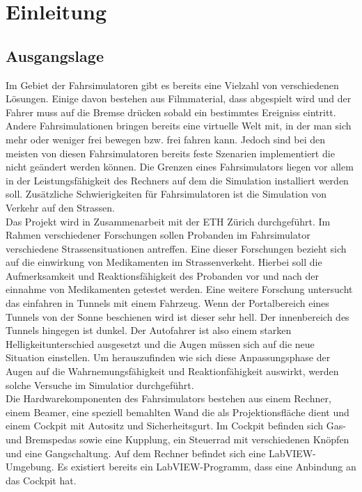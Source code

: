 \section{Einleitung}
\subsection{Ausgangslage}

Im Gebiet der Fahrsimulatoren gibt es bereits eine Vielzahl von verschiedenen Lösungen. Einige davon bestehen aus Filmmaterial, dass abgespielt wird und der Fahrer muss auf die Bremse drücken sobald ein bestimmtes Ereigniss eintritt. Andere Fahrsimulationen bringen bereits eine virtuelle Welt mit, in der man sich mehr oder weniger frei bewegen bzw. frei fahren kann. Jedoch sind bei den meisten von diesen Fahrsimulatoren bereits feste Szenarien implementiert die  nicht geändert werden können. Die Grenzen eines Fahrsimulators liegen vor allem in der Leistungsfähigkeit des Rechners auf dem die Simulation installiert werden soll. Zusätzliche Schwierigkeiten für Fahrsimulatoren ist die Simulation von Verkehr auf den Strassen. \\
Das Projekt wird in Zusammenarbeit mit der ETH Zürich durchgeführt. Im Rahmen verschiedener Forschungen sollen Probanden im Fahrsimulator verschiedene Strassensituationen antreffen. Eine dieser Forschungen bezieht sich auf die einwirkung von Medikamenten im Strassenverkeht. Hierbei soll die Aufmerksamkeit und Reaktionsfähigkeit des Probanden vor und nach der einnahme von Medikamenten getestet werden. Eine weitere Forschung untersucht das einfahren in Tunnels mit einem Fahrzeug. Wenn der Portalbereich eines Tunnels von der Sonne beschienen wird ist dieser sehr hell. Der innenbereich des Tunnels hingegen ist dunkel. Der Autofahrer ist also einem starken Helligkeitunterschied ausgesetzt und die Augen müssen sich auf die neue Situation einstellen. Um herauszufinden wie sich diese Anpassungsphase der Augen auf die Wahrnemungsfähigkeit und Reaktionfähigkeit auswirkt, werden solche Versuche im Simulatior durchgeführt. \\
Die Hardwarekomponenten des Fahrsimulators bestehen aus einem Rechner, einem Beamer, eine speziell bemahlten Wand die als Projektionsfläche dient und einem Cockpit mit Autositz und Sicherheitsgurt. Im Cockpit befinden sich Gas- und Bremspedas sowie eine Kupplung, ein Steuerrad mit verschiedenen Knöpfen und eine Gangschaltung. Auf dem Rechner befindet sich eine LabVIEW-Umgebung. Es existiert bereits ein LabVIEW-Programm, dass eine Anbindung an das Cockpit hat.

